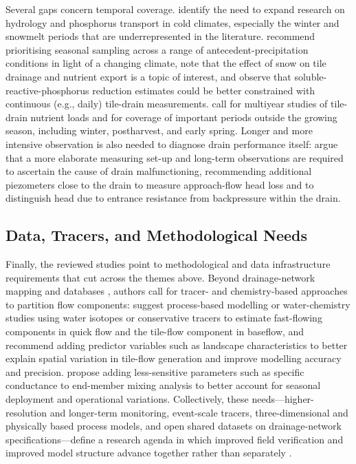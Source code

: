 Several gaps concern temporal coverage. \textcite{King2015} identify the need to expand research on hydrology and phosphorus transport in cold climates, especially the winter and snowmelt periods that are underrepresented in the literature. \textcite{Trentman2020} recommend prioritising seasonal sampling across a range of antecedent-precipitation conditions in light of a changing climate, note that the effect of snow on tile drainage and nutrient export is a topic of interest, and observe that soluble-reactive-phosphorus reduction estimates could be better constrained with continuous (e.g., daily) tile-drain measurements. \textcite{Millar2025} call for multiyear studies of tile-drain nutrient loads and for coverage of important periods outside the growing season, including winter, postharvest, and early spring. Longer and more intensive observation is also needed to diagnose drain performance itself: \textcite{Rimidis2003} argue that a more elaborate measuring set-up and long-term observations are required to ascertain the cause of drain malfunctioning, recommending additional piezometers close to the drain to measure approach-flow head loss and to distinguish head due to entrance resistance from backpressure within the drain.

\subsection{Data, Tracers, and Methodological Needs}

Finally, the reviewed studies point to methodological and data infrastructure requirements that cut across the themes above. Beyond drainage-network mapping and databases \parencite{Zhou2025,Valayamkunnath2020,Naz2009}, authors call for tracer- and chemistry-based approaches to partition flow components: \textcite{Frederiksen2023} suggest process-based modelling or water-chemistry studies using water isotopes or conservative tracers to estimate fast-flowing components in quick flow and the tile-flow component in baseflow, and recommend adding predictor variables such as landscape characteristics to better explain spatial variation in tile-flow generation and improve modelling accuracy and precision. \textcite{Schilling2019} propose adding less-sensitive parameters such as specific conductance to end-member mixing analysis to better account for seasonal deployment and operational variations. Collectively, these needs---higher-resolution and longer-term monitoring, event-scale tracers, three-dimensional and physically based process models, and open shared datasets on drainage-network specifications---define a research agenda in which improved field verification and improved model structure advance together rather than separately \parencite{Schilling2008,Bauwe2016,Zhou2025}.